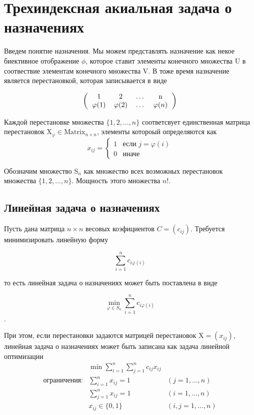 \documentclass[14pt,a4paper]{article}
\begin{document}
\section{Трехиндексная акиальная задача о назначениях}
Введем понятие назначения. Мы можем
представлять назначение как некое биективное отображение $\phi$, которое ставит
элементы конечного множества $\mathrm{U}$ в соотвествие элементам конечного
множества $\mathrm{V}$. В тоже время назначение является перестановкой, которая записывается
в виде

\[
\left (
  \begin{tabular}{cccc}
  1 & 2 & \ldots & n\\
  $\varphi (1)$ & $\varphi (2)$ & \ldots & $\varphi (n)$
  \end{tabular}
\right )
\]

Каждой перестановке множества $\{1, 2, \ldots , n \}$ соответсвует единственная матрица
перестановок $\mathrm{X}_\varphi \in \mathrm{Matrix}_{n \times n}$, элементы котороый определяются как
\[
x_{ij} =
 \begin{cases}
   1 & \text{если } j = \varphi(i) \\
   0 & \text{иначе}
 \end{cases}
\]

Обозначим множество $\mathrm{S}_n$ как множество всех возможных перестановок множества
 $\{1, 2, \ldots , n \}$. Мощность этого множества $n!$.

\subsection{Линейная задача о назначениях}
Пусть дана матрица $n \times n$ весовых коэфициентов $C = (c_{ij})$.
Требуется минимизировать линейную форму

\[
  \sum^n_{i = 1} c_{i \varphi (i)}
\]

то есть линейная задача о назначениях может быть поставлена в виде

\[
  \min_{\varphi \in S_n} \sum^n_{i = 1} c_{i \varphi (i)}
\].

При этом, если перестановки задаются матрицей перестановок $\mathrm{X} = (x_{ij})$,
линейная задача о назначениях может быть записана как задача линейной оптимизации
\begin{align}
  & \min \displaystyle \sum^n_{i = 1} \displaystyle \sum^n_{j = 1} c_{ij} x_{ij} \\
  \text{ограничения:} & \displaystyle \sum^n_{i = 1} x_{ij} = 1 &(j = 1, \ldots, n) \\
  &\displaystyle \sum^n_{j = 1} x_{ij} = 1 &(i = 1, \ldots, n) \\
  & x_{ij} \in \{ 0, 1 \}
  &(i,j = 1, \ldots, n)
\end{align}
\end{document}
